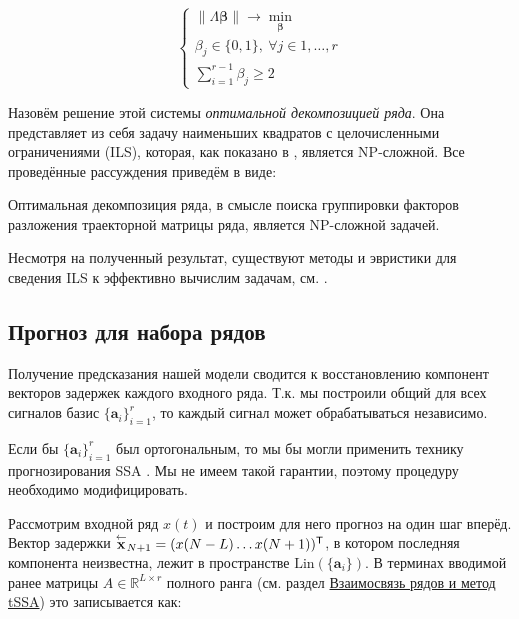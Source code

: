 	    	\begin{equation}\label{eq:decomp_search_final}
	    		\begin{cases*}
	    			\lVert \Lambda \boldsymbol{\beta} \rVert \to \underset{\boldsymbol{\beta}}{\min} \\
	    			\beta_j \in \{0, 1\}, \ \forall j \in 1, \ldots, r \\
	    			\sum\limits_{i = 1}^{r - 1} \beta_j \ge 2
	    		\end{cases*}
	    	\end{equation}
	    	
	    	Назовём решение этой системы \emph{оптимальной декомпозицией ряда}. Она представляет из себя задачу наименьших квадратов с целочисленными ограничениями (ILS), которая, как показано в \cite{van1981another}, является NP-сложной. Все проведённые рассуждения приведём в виде:
	    	
	    	\begin{Th}
	    		Оптимальная декомпозиция ряда, в смысле поиска группировки факторов разложения траекторной матрицы ряда, является NP-сложной задачей.
	    	\end{Th}
	    	
	    	Несмотря на полученный результат, существуют методы и эвристики для сведения ILS к эффективно вычислим задачам, см. \cite{Grafarend2022}.
	    	
	    	
	    \subsection*{Прогноз для набора рядов}\label{sec:tssa_forecast}
	     
	    	Получение предсказания нашей модели сводится к восстановлению компонент векторов задержек каждого входного ряда. Т.к. мы построили общий для всех сигналов базис $ \{\mathbf{a}_i\}_{i = 1}^r $, то каждый сигнал может обрабатываться независимо.
	    	
	    	Если бы $ \{\mathbf{a}_i\}_{i = 1}^r $ был ортогональным, то мы бы могли применить технику прогнозирования SSA \cite{ecfb9dc578be43ae9ee8fc88b8ff9151}. Мы не имеем такой гарантии, поэтому процедуру необходимо модифицировать.
	    	
	    	Рассмотрим входной ряд $ x(t) $ и построим для него прогноз на один шаг вперёд. Вектор задержки $ \overset{\leftarrow}{\mathbf{x}}_{N + 1} = (x(N - L) \ldots x(N + 1))^{\mathsf{T}} $, в котором последняя компонента неизвестна, лежит в пространстве $ \text{Lin}(\{\mathbf{a}_i\}) $. В терминах вводимой ранее матрицы $ A \in \mathbb{R}^{L \times r} $ полного ранга (см. раздел \hyperref[sec:tssa_method]{Взаимосвязь рядов и метод tSSA}) это записывается как:
	    	

